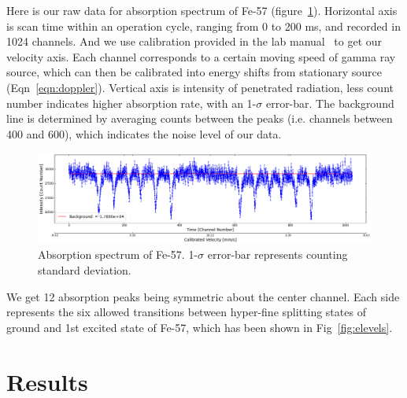 \documentclass[letterpaper,12pt]{article}
\begin{document}
Here is our raw data for absorption spectrum of Fe-57 (figure~\ref{fig:raw_data}).  Horizontal axis is scan time within an operation cycle, ranging from 0 to 200 ms, and recorded in 1024 channels. And we use calibration provided in the lab manual~\cite{labManual} to get our velocity axis. Each channel corresponds to a certain moving speed of gamma ray source, which can then be calibrated into energy shifts from stationary source (Eqn~\ref{eqn:doppler}). 
Vertical axis is intensity of penetrated radiation, less count number indicates higher absorption rate, with an 1-$\sigma$ error-bar. The background line is determined by averaging counts between the peaks (i.e. channels between 400 and 600), which indicates the noise level of our data. 

\begin{figure}[H] 
        \centering \includegraphics[width=1\columnwidth]{raw_data.png}
        \caption{\label{fig:raw_data}
        Absorption spectrum of Fe-57. 1-$\sigma$ error-bar represents counting standard deviation.
        }
\end{figure}

We get 12 absorption peaks being symmetric about the center channel. Each side represents the six allowed transitions between hyper-fine splitting states of ground and 1st excited state of Fe-57, which has been shown in Fig~\ref{fig:elevels}.  

\section{Results}
    
    
    
\end{document}
